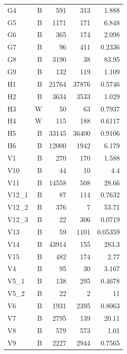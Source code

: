 \begin{longtable}{lrrrr}
G4 & B & 591 & 313 & 1.888\\
G5 & B & 1171 & 171 & 6.848\\
G6 & B & 365 & 174 & 2.098\\
G7 & B & 96 & 411 & 0.2336\\
G8 & B & 3190 & 38 & 83.95\\
G9 & B & 132 & 119 & 1.109\\
H1 & B & 21764 & 37876 & 0.5746\\
H2 & B & 3634 & 3533 & 1.029\\
H3 & W & 50 & 63 & 0.7937\\
H4 & W & 115 & 188 & 0.6117\\
H5 & B & 33145 & 36400 & 0.9106\\
H6 & B & 12000 & 1942 & 6.179\\
V1 & B & 270 & 170 & 1.588\\
V10 & B & 44 & 10 & 4.4\\
V11 & B & 14558 & 508 & 28.66\\
V12\_1 & B & 87 & 114 & 0.7632\\
V12\_2 & B & 376 & 7 & 53.71\\
V12\_3 & B & 22 & 306 & 0.0719\\
V13 & B & 59 & 1101 & 0.05359\\
V14 & B & 43914 & 155 & 283.3\\
V15 & B & 482 & 174 & 2.77\\
V4 & B & 95 & 30 & 3.167\\
V5\_1 & B & 138 & 295 & 0.4678\\
V5\_2 & B & 22 & 2 & 11\\
V6 & B & 1931 & 2395 & 0.8063\\
V7 & B & 2795 & 139 & 20.11\\
V8 & B & 579 & 573 & 1.01\\
V9 & B & 2227 & 2944 & 0.7565\\
\bottomrule\end{longtable}\normalsize
